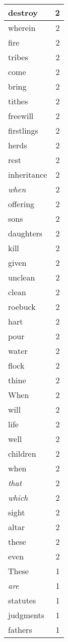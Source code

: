 \begin{center}
\begin{longtable}{l|r}
destroy & 2 \\ \hline
wherein & 2 \\ \hline
fire & 2 \\ \hline
tribes & 2 \\ \hline
come & 2 \\ \hline
bring & 2 \\ \hline
tithes & 2 \\ \hline
freewill & 2 \\ \hline
firstlings & 2 \\ \hline
herds & 2 \\ \hline
rest & 2 \\ \hline
inheritance & 2 \\ \hline
\emph{when} & 2 \\ \hline
offering & 2 \\ \hline
sons & 2 \\ \hline
daughters & 2 \\ \hline
kill & 2 \\ \hline
given & 2 \\ \hline
unclean & 2 \\ \hline
clean & 2 \\ \hline
roebuck & 2 \\ \hline
hart & 2 \\ \hline
pour & 2 \\ \hline
water & 2 \\ \hline
flock & 2 \\ \hline
thine & 2 \\ \hline
When & 2 \\ \hline
will & 2 \\ \hline
life & 2 \\ \hline
well & 2 \\ \hline
children & 2 \\ \hline
when & 2 \\ \hline
\emph{that} & 2 \\ \hline
\emph{which} & 2 \\ \hline
sight & 2 \\ \hline
altar & 2 \\ \hline
these & 2 \\ \hline
even & 2 \\ \hline
These & 1 \\ \hline
\emph{are} & 1 \\ \hline
statutes & 1 \\ \hline
judgments & 1 \\ \hline
fathers & 1 \\ \hline

\end{longtable}
\end{center}
